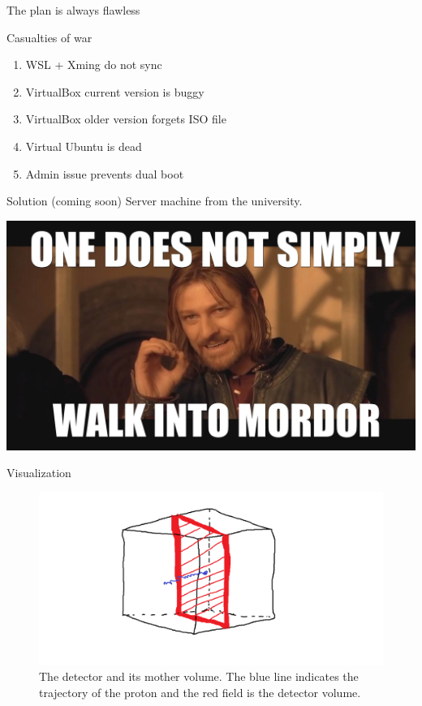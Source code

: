 \documentclass[11pt]{beamer}
\begin{document}
\begin{frame}{The plan is always flawless}
    \begin{alertblock}{Casualties of war}
    \begin{enumerate}
        \item WSL + Xming do not sync
        \item VirtualBox current version is buggy
        \item VirtualBox older version forgets ISO file
        \item Virtual Ubuntu is dead
        \item Admin issue prevents dual boot
    \end{enumerate}
    \end{alertblock}
    
    \begin{block}{Solution (coming soon)}
    Server machine from the university.
    \end{block}
    \centering
    \includegraphics[scale = 0.08]{mordor.jpg}
\end{frame}

\begin{frame}{Visualization}
\begin{figure}
    \centering
    \includegraphics[width = \textwidth]{kreativitas.png}
    The detector and its mother volume. The blue line indicates the trajectory of the proton and the red field is the detector volume.
    \label{fig:my_label}
\end{figure}
    
\end{frame}
\end{document}
